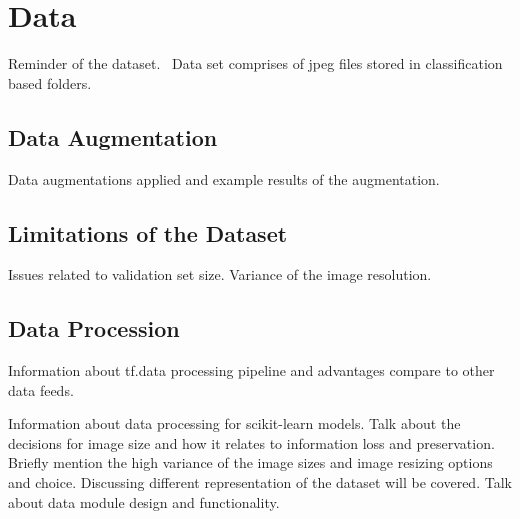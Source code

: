 \chapter{Data} \label{chap:data}
Reminder of the dataset.~\cite{openi} 
Data set comprises of jpeg files stored in classification based folders.

\section{Data Augmentation}
Data augmentations applied and example results of the augmentation.

\section{Limitations of the Dataset}
Issues related to validation set size. Variance of the image resolution.

\section{Data Procession}
Information about tf.data processing pipeline and advantages compare to other data feeds.

Information about data processing for scikit-learn models.
Talk about the decisions for image size and how it relates to information loss and preservation. Briefly mention the high variance of the image sizes and image resizing options and choice.
Discussing different representation of the dataset will be covered.
Talk about data module design and functionality.
\clearpage